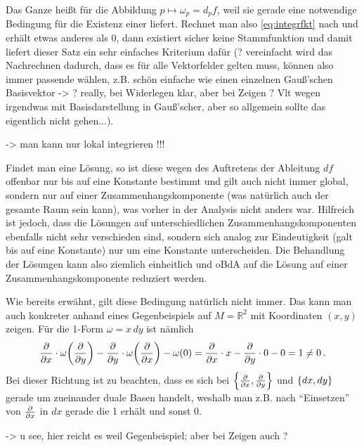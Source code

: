 \documentclass[../H_Analysis_main.tex]{subfiles}
\begin{document}
Das Ganze heißt  für die Abbildung $p \mapsto \omega_p = d_p f$, weil sie gerade eine notwendige Bedingung für die Existenz einer  liefert. Rechnet man also \eqref{eq:integrfkt} nach und erhält etwas anderes als 0, dann existiert sicher keine Stammfunktion und damit liefert dieser Satz ein sehr einfaches Kriterium dafür (? vereinfacht wird das Nachrechnen dadurch, dass es für alle Vektorfelder gelten muss, können also immer passende wählen, z.B. schön einfache wie einen einzelnen Gauß'schen Basisvektor -> ? really, bei Widerlegen klar, aber bei Zeigen ? Vlt wegen irgendwas mit Basisdarstellung in Gauß'scher, aber so allgemein sollte das eigentlich nicht gehen...).

-> man kann nur lokal integrieren !!!

Findet man eine Lösung, so ist diese wegen des Auftretens der Ableitung $df$ offenbar nur bis auf eine Konstante bestimmt und gilt auch nicht immer global, sondern nur auf einer Zusammenhangskomponente (was natürlich auch der gesamte Raum sein kann), was vorher in der Analysis nicht anders war. Hilfreich ist jedoch, dass die Lösungen auf unterschiedlichen Zusammenhangskomponenten ebenfalls nicht sehr verschieden sind, sondern sich analog zur Eindeutigkeit (galt bis auf eine Konstante) nur um eine Konstante unterscheiden. Die Behandlung der Lösungen kann also ziemlich einheitlich und oBdA auf die Lösung auf einer Zusammenhangskomponente reduziert werden.


\begin{bsp}[Gegenbeispiel]
Wie bereits erwähnt, gilt diese Bedingung natürlich nicht immer. Das kann man auch konkreter anhand eines Gegenbeispiels auf $M = \mathbb{R}^2$ mit Koordinaten $(x, y)$ zeigen. Für die 1-Form $\omega = x \, dy$ ist nämlich
\begin{equation*}
\pdv{x} \cdot \omega\qty(\pdv{y}) - \pdv{y} \cdot \omega\qty(\pdv{x}) - \omega(0) = \pdv{x} \cdot x - \pdv{y} \cdot 0 - 0 = 1 \neq 0 \, .
\end{equation*}
Bei dieser Richtung ist zu beachten, dass es sich bei $\qty{\pdv{x}, \pdv{y}}$ und $\qty{dx, dy}$ gerade um zueinander duale Basen handelt, weshalb man z.B. nach \enquote{Einsetzen} von $\pdv{x}$ in $dx$ gerade die 1 erhält und sonst 0.

-> u see, hier reicht es weil Gegenbeispiel; aber bei Zeigen auch ?
\end{bsp}
\end{document}
